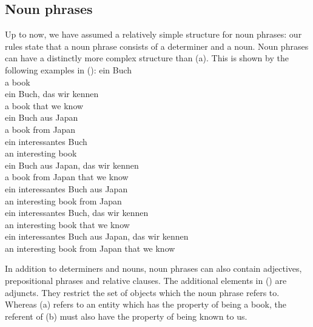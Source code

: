 \subsection{Noun phrases}
\label{sec-psg-np}

Up to now, we have assumed a relatively simple structure for noun phrases: our rules state that a noun phrase consists of a determiner and a
noun. Noun phrases can have a distinctly more complex structure than (a). This is shown by the following examples in ():
\eal
\label{Beispiele-NP-Adjunkte}
\ex 
\gll ein Buch\\
     a   book\\
\ex
\label{ex-ein-Buch-das-wir-kennen} 
\gll ein Buch, das  wir kennen\\
     a   book  that we  know\\
\ex 
\label{ex-ein-Buch-aus-Japan}
\gll ein Buch aus  Japan\\
     a   book from Japan\\
\ex 
\gll ein interessantes Buch\\
     an   interesting   book\\
\ex 
\gll ein Buch aus  Japan, das  wir kennen\\
     a   book from Japan  that we  know\\
\ex 
\gll ein interessantes Buch aus  Japan\\
     an  interesting   book from Japan\\
\ex 
\gll ein interessantes Buch, das  wir kennen\\
     an  interesting   book  that we  know\\
\ex 
\gll ein interessantes Buch aus  Japan, das  wir kennen\\
     an  interesting   book from Japan  that we  know\\
\zl

\noindent
In addition to determiners and nouns, noun phrases can also contain adjectives, prepositional phrases and relative clauses. 
The additional elements in () are adjuncts. They restrict the set of objects which the noun phrase 
refers to. Whereas (a) refers to an entity which has the property of being a book, the referent of (b) must
also have the property of being known to us.


